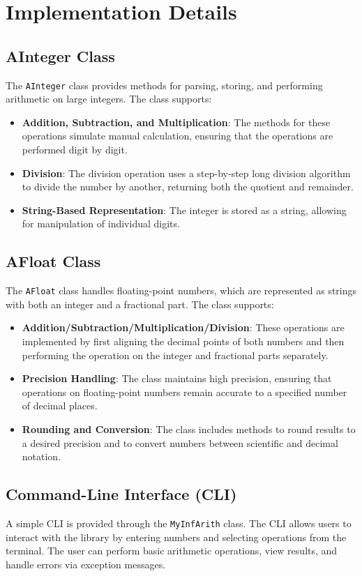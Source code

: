 \documentclass[12pt]{article}
\begin{document}
\section{Implementation Details}

\subsection{AInteger Class}
The \texttt{AInteger} class provides methods for parsing, storing, and performing arithmetic on large integers. The class supports:
\begin{itemize}
    \item \textbf{Addition, Subtraction, and Multiplication}: The methods for these operations simulate manual calculation, ensuring that the operations are performed digit by digit.
    \item \textbf{Division}: The division operation uses a step-by-step long division algorithm to divide the number by another, returning both the quotient and remainder.
    \item \textbf{String-Based Representation}: The integer is stored as a string, allowing for manipulation of individual digits.
\end{itemize}

\subsection{AFloat Class}
The \texttt{AFloat} class handles floating-point numbers, which are represented as strings with both an integer and a fractional part. The class supports:
\begin{itemize}
    \item \textbf{Addition/Subtraction/Multiplication/Division}: These operations are implemented by first aligning the decimal points of both numbers and then performing the operation on the integer and fractional parts separately.
    \item \textbf{Precision Handling}: The class maintains high precision, ensuring that operations on floating-point numbers remain accurate to a specified number of decimal places.
    \item \textbf{Rounding and Conversion}: The class includes methods to round results to a desired precision and to convert numbers between scientific and decimal notation.
\end{itemize}

\subsection{Command-Line Interface (CLI)}
A simple CLI is provided through the \texttt{MyInfArith} class. The CLI allows users to interact with the library by entering numbers and selecting operations from the terminal. The user can perform basic arithmetic operations, view results, and handle errors via exception messages.
\end{document}
